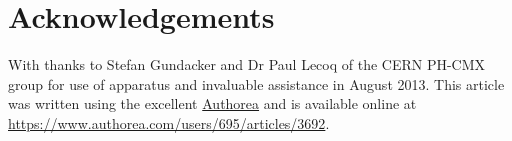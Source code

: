 \section*{Acknowledgements}
With thanks to Stefan Gundacker and Dr Paul Lecoq of the CERN PH-CMX group for use of apparatus and invaluable assistance in August 2013. This article was written using the excellent \href{www.authorea.com}{Authorea} and is available online at \href{https://www.authorea.com/users/695/articles/3692}{https://www.authorea.com/users/695/articles/3692}.